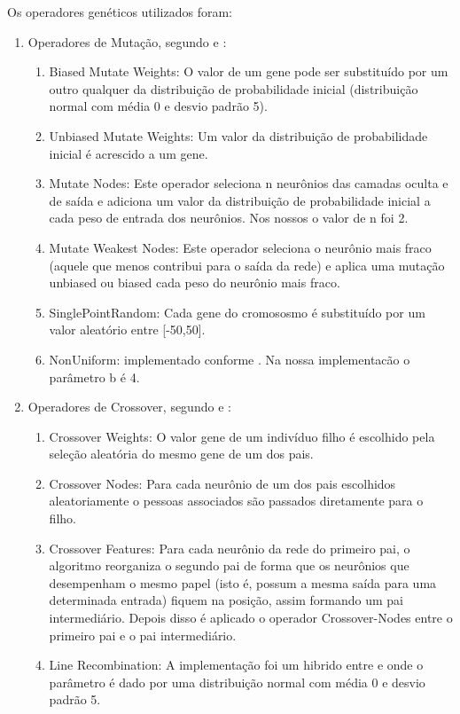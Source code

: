 \documentclass[12pt]{article}
\begin{document}
\par Os operadores genéticos utilizados foram:
\begin{enumerate}

	\item Operadores de Mutação, segundo \cite{montana} e \cite{Liu}:
	\begin{enumerate}
		\item Biased Mutate Weights: O valor de um gene pode ser substituído por um outro qualquer da distribuição de probabilidade inicial (distribuição normal com média 0 e desvio padrão 5).
		\item Unbiased Mutate Weights: Um valor da distribuição de probabilidade inicial é acrescido a um gene.
		\item Mutate Nodes: Este operador seleciona n neurônios das camadas oculta e de saída e adiciona um valor da distribuição de probabilidade inicial a cada peso de entrada dos neurônios. Nos nossos o valor de n foi 2.
		\item Mutate Weakest Nodes: Este operador seleciona o neurônio mais fraco (aquele que menos contribui para o saída da rede) e aplica uma mutação unbiased ou biased cada peso do neurônio mais fraco.
		\item SinglePointRandom: Cada gene do cromososmo é substituído por um valor aleatório entre [-50,50].
		\item NonUniform: implementado conforme \cite{Michalewicz}. Na nossa implementacão o parâmetro b é 4.
		
	\end{enumerate}

	\item Operadores de Crossover, segundo \cite{montana} e \cite{Liu}:
	\begin{enumerate}
		\item Crossover Weights: O valor gene de um indivíduo filho é escolhido pela seleção aleatória do mesmo gene de um dos pais.
		\item Crossover Nodes: Para cada neurônio de um dos pais escolhidos aleatoriamente o pessoas associados são passados diretamente para o filho.
		\item Crossover Features: Para cada neurônio da rede do primeiro pai, o algoritmo reorganiza o segundo pai de forma que os neurônios que desempenham o mesmo papel (isto é, possum a mesma saída para uma determinada entrada) fiquem na posição, assim formando um pai intermediário. Depois disso é aplicado o operador Crossover-Nodes entre o primeiro pai e o pai intermediário.
		\item Line Recombination: A implementação foi um hibrido entre \cite{Liu} e \cite{essentials} onde o parâmetro é dado por uma distribuição normal com média 0 e desvio padrão 5.
	\end{enumerate}

\end{enumerate}
\end{document}
